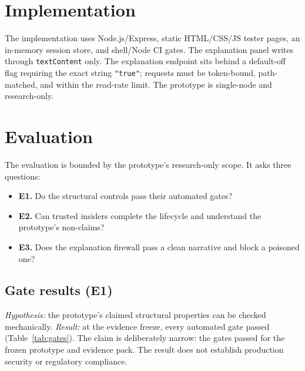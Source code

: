\documentclass[conference]{IEEEtran}
\begin{document}
\section{Implementation}

The implementation uses Node.js/Express, static HTML/CSS/JS tester pages, an
in-memory session store, and shell/Node CI gates. The explanation panel writes
through \texttt{textContent} only. The explanation endpoint sits behind a
default-off flag requiring the exact string \texttt{"true"}; requests must be
token-bound, path-matched, and within the read-rate limit. The prototype is
single-node and research-only.

\section{Evaluation}

The evaluation is bounded by the prototype's research-only scope. It asks three
questions:
\begin{itemize}
  \item \textbf{E1.} Do the structural controls pass their automated gates?
  \item \textbf{E2.} Can trusted insiders complete the lifecycle and understand
    the prototype's non-claims?
  \item \textbf{E3.} Does the explanation firewall pass a clean narrative and
    block a poisoned one?
\end{itemize}

\subsection{Gate results (E1)}

\emph{Hypothesis:} the prototype's claimed structural properties can be checked
mechanically. \emph{Result:} at the evidence freeze, every automated gate passed
(Table~\ref{tab:gates}). The claim is deliberately narrow: the gates passed for
the frozen prototype and evidence pack. The result does not establish production
security or regulatory compliance.
\end{document}
